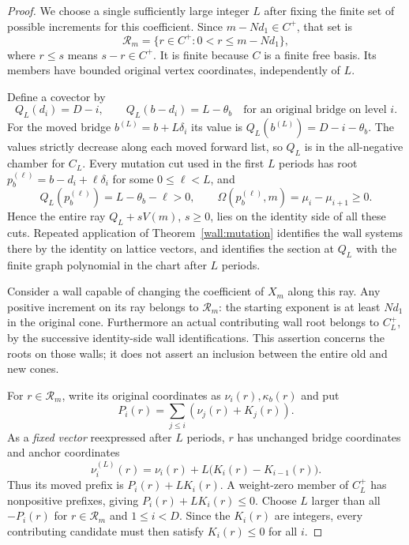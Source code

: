 \begin{proof}
We choose a single sufficiently large integer $L$ after fixing the
finite set of possible increments for this coefficient.
Since $m-Nd_1\in C^+$, that set is
\begin{equation}\label{tri:finite-candidates}
 \mathcal R_m=\{r\in C^+:0<r\leq m-Nd_1\},
\end{equation}
where $r\leq s$ means $s-r\in C^+$.  It is finite because $C$ is a
finite free basis.  Its members have bounded original vertex
coordinates, independently of $L$.

Define a covector by
\begin{equation}\label{tri:test-covector}
 Q_L(d_i)=D-i,\qquad Q_L(b-d_i)=L-\theta_b
 \quad\text{for an original bridge on level }i.
\end{equation}
For the moved bridge $b^{(L)}=b+L\delta_i$ its value is
$Q_L(b^{(L)})=D-i-\theta_b$.  The values strictly decrease along
each moved forward list, so $Q_L$ is in the all-negative chamber
for $C_L$.
Every mutation cut used in the first $L$ periods has root
$p_b^{(\ell)}=b-d_i+\ell\delta_i$ for some $0\leq\ell<L$, and
\[
 Q_L(p_b^{(\ell)})=L-\theta_b-\ell>0,
 \qquad \Omega(p_b^{(\ell)},m)=\mu_i-\mu_{i+1}\geq0.
\]
Hence the entire ray $Q_L+sV(m)$, $s\geq0$, lies on the identity
side of all these cuts.  Repeated application of
Theorem~\ref{wall:mutation} identifies the wall systems there by
the identity on lattice vectors, and identifies the section at
$Q_L$ with the finite graph polynomial in the chart after $L$
periods.

Consider a wall capable of changing the coefficient of $X_m$ along
this ray.  Any positive increment on its ray belongs to
$\mathcal R_m$: the starting exponent is at least $Nd_1$ in the
original cone.  Furthermore an actual contributing wall root belongs
to $C_L^+$, by the successive identity-side wall identifications.
This assertion concerns the roots on those walls; it does not assert
an inclusion between the entire old and new cones.

For $r\in\mathcal R_m$, write its original coordinates as
$\nu_i(r),\kappa_b(r)$ and put
\[
 P_i(r)=\sum_{j\leq i}(\nu_j(r)+K_j(r)).
\]
As a \emph{fixed vector} reexpressed after $L$ periods, $r$ has
unchanged bridge coordinates and anchor coordinates
\begin{equation}\label{tri:moving-prefix}
 \nu_i^{(L)}(r)=\nu_i(r)+L\bigl(K_i(r)-K_{i-1}(r)\bigr).
\end{equation}
Thus its moved prefix is $P_i(r)+LK_i(r)$.  A weight-zero member of
$C_L^+$ has nonpositive prefixes, giving
$P_i(r)+LK_i(r)\leq0$.
Choose $L$ larger than all $-P_i(r)$ for $r\in\mathcal R_m$ and
$1\leq i<D$.  Since the $K_i(r)$ are integers, every contributing
candidate must then satisfy $K_i(r)\leq0$ for all $i$.


\end{proof}
